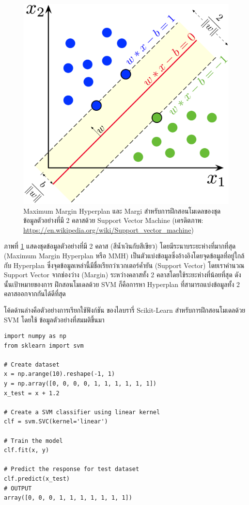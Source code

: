 \begin{figure}[htbp]
    \centering
    \includegraphics[width=0.65\linewidth]{fig/svm.png}
    \caption{Maximum Margin Hyperplan และ Margi สำหรับการฝึกสอนโมเดลของชุดข้อมูลตัวอย่างที่มี 2 คลาสด้วย Support Vector 
    Machine (เครดิตภาพ: \url{https://en.wikipedia.org/wiki/Support_vector_machine})}
    \label{fig:svm_margin}
\end{figure}

ภาพที่ \ref{fig:svm_margin} แสดงชุดข้อมูลตัวอย่างที่มี 2 คลาส (สีน้ำเงินกับสีเขียว) โดยมีระนาบระยะห่างที่มากที่สุด (Maximum Margin 
Hyperplan หรือ MMH) เป็นตัวแบ่งข้อมูลซึ่งอ้างอิงโดยจุดข้อมูลที่อยู่ใกล้กับ Hyperplan ซึ่งจุดข้อมูลเหล่านี้มีชื่อเรียกว่าเวกเตอร์ค้ำยัน (Support 
Vector) โดยเราคำนวณ Support Vector จากช่องว่าง (Margin) ระหว่างคลาสทั้ง 2 คลาสโดยใช้ระยะห่างที่น้อยที่สุด ดังนั้นเป้าหมายของการ%
ฝึกสอนโมเดลด้วย SVM ก็คือการหา Hyperplan ที่สามารถแบ่งข้อมูลทั้ง 2 คลาสออกจากกันได้ดีที่สุด

โค้ดด้านล่างคือตัวอย่างการเรียกใช้ฟังก์ชัน  ของไลบรารี่ Scikit-Learn สำหรับการฝึกสอนโมเดลด้วย SVM โดยใช้%
ข้อมูลตัวอย่างที่สมมติขึ้นมา

\begin{lstlisting}[style=MyPython]
import numpy as np
from sklearn import svm

# Create dataset
x = np.arange(10).reshape(-1, 1)
y = np.array([0, 0, 0, 0, 1, 1, 1, 1, 1, 1])
x_test = x + 1.2

# Create a SVM classifier using linear kernel
clf = svm.SVC(kernel='linear')

# Train the model
clf.fit(x, y)

# Predict the response for test dataset
clf.predict(x_test)
# OUTPUT
array([0, 0, 0, 1, 1, 1, 1, 1, 1, 1])
\end{lstlisting}

